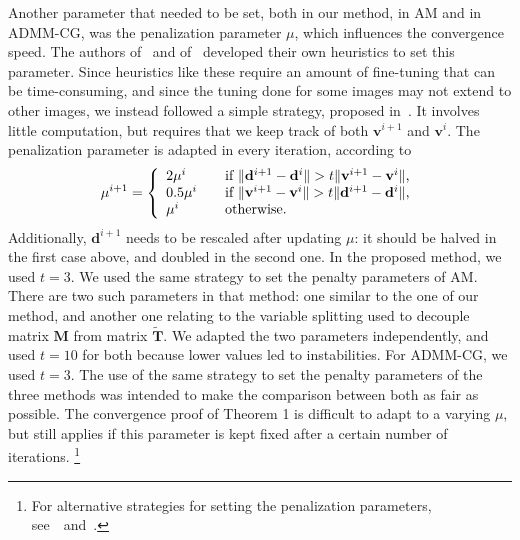 \documentclass[10pt,twocolumn,twoside]{IEEEtran}
\newcommand{\vs}{\mathbf{v}} %
\newcommand{\dv}{\mathbf{d}} %
\newcommand{\M}{\mathbf{M}} %
\newcommand{\T}{\mathbf{T}} %
\begin{document}
Another parameter that needed to be set, both in our method, in AM and in ADMM-CG, was the penalization parameter $\mu$, which influences the convergence speed. The authors of~\cite{Almeida2013a} and of~\cite{Matakos2013} developed their own heuristics to set this parameter. Since heuristics like these require an amount of fine-tuning that can be time-consuming, and since the tuning done for some images may not extend to other images, we instead followed a simple strategy, proposed in~\cite{Boyd2011}. It involves little computation, but requires that we keep track of both $\vs^{i+1}$ and $\vs^i$. The penalization parameter is adapted in every iteration, according to 
\begin{equation} \label{eq:varying_penalty}
	\mu^{i+1} = \left\{
	\begin{array}{l l}
		2\mu^i & \quad \text{if $\| \dv^{i+1} - \dv^i \| > t \| \vs^{i+1} - \vs^i \|$,}\\
		0.5\mu^i & \quad \text{if $\| \vs^{i+1} - \vs^i \| > t \| \dv^{i+1} - \dv^i \|$,}\\
		\mu^i & \quad \text{otherwise.}
	\end{array} \right.
\end{equation}
Additionally, $\dv^{i+1}$ needs to be rescaled after updating $\mu$: it should be halved in the first case above, and doubled in the second one. In the proposed method, we used $t=3$. We used the same strategy to set the penalty parameters of AM. There are two such parameters in that method: one similar to the one of our method, and another one relating to the variable splitting used to decouple matrix $\M$ from matrix $\tilde{\T}$. We adapted the two parameters independently, and used $t=10$ for both because lower values led to instabilities. For ADMM-CG, we used $t=3$. The use of the same strategy to set the penalty parameters of the three methods was intended to make the comparison between both as fair as possible. The convergence proof of Theorem 1 is difficult to adapt to a varying $\mu$, but still applies if this parameter is kept fixed after a certain number of iterations. \footnote{For alternative strategies for setting the penalization parameters, see~\mbox{\cite{Boyd2011} and \cite{He2000}}.}
\end{document}
